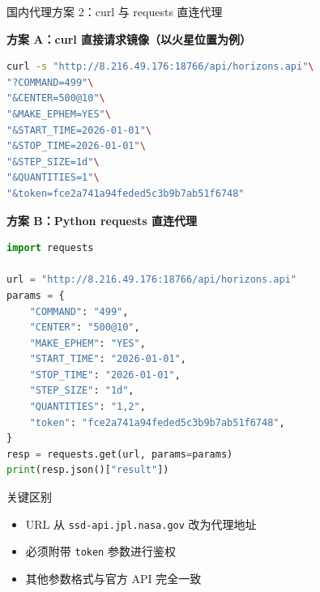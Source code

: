 \documentclass[aspectratio=169]{ctexbeamer}
\begin{document}
\begin{frame}{国内代理方案 2：curl 与 requests 直连代理}
\small

\textbf{方案 A：curl 直接请求镜像（以火星位置为例）}

\begin{lstlisting}[language=bash]
curl -s "http://8.216.49.176:18766/api/horizons.api"\
"?COMMAND=499"\
"&CENTER=500@10"\
"&MAKE_EPHEM=YES"\
"&START_TIME=2026-01-01"\
"&STOP_TIME=2026-01-01"\
"&STEP_SIZE=1d"\
"&QUANTITIES=1"\
"&token=fce2a741a94feded5c3b9b7ab51f6748"
\end{lstlisting}

\vspace{0.15cm}

\textbf{方案 B：Python requests 直连代理}

\begin{lstlisting}[language=python]
import requests

url = "http://8.216.49.176:18766/api/horizons.api"
params = {
    "COMMAND": "499",
    "CENTER": "500@10",
    "MAKE_EPHEM": "YES",
    "START_TIME": "2026-01-01",
    "STOP_TIME": "2026-01-01",
    "STEP_SIZE": "1d",
    "QUANTITIES": "1,2",
    "token": "fce2a741a94feded5c3b9b7ab51f6748",
}
resp = requests.get(url, params=params)
print(resp.json()["result"])
\end{lstlisting}

\begin{block}{关键区别}
  \begin{itemize}
    \setlength\itemsep{2pt}
    \item URL 从 \texttt{ssd-api.jpl.nasa.gov} 改为代理地址
    \item 必须附带 \texttt{token} 参数进行鉴权
    \item 其他参数格式与官方 API \alert{完全一致}
  \end{itemize}
\end{block}
\end{frame}
\end{document}
